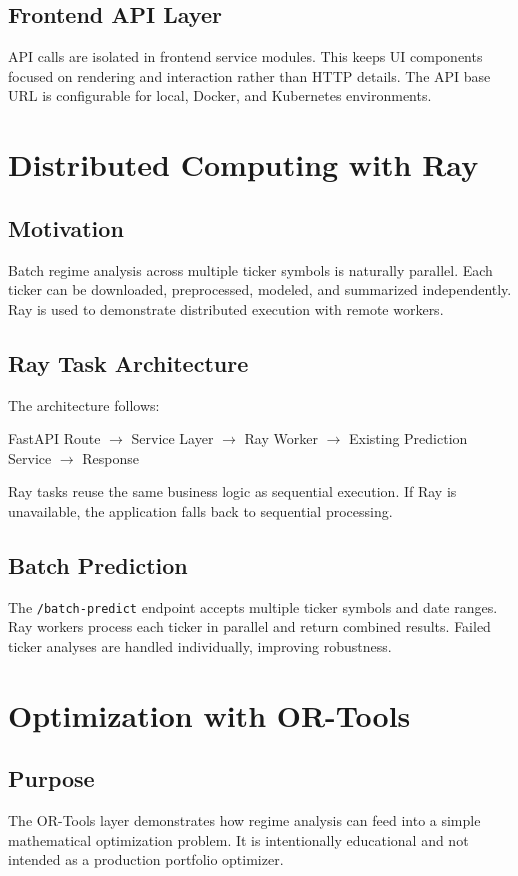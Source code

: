 \documentclass[12pt,a4paper]{report}
\begin{document}
\section{Frontend API Layer}
API calls are isolated in frontend service modules. This keeps UI components focused on rendering and interaction rather than HTTP details. The API base URL is configurable for local, Docker, and Kubernetes environments.

\chapter{Distributed Computing with Ray}
\section{Motivation}
Batch regime analysis across multiple ticker symbols is naturally parallel. Each ticker can be downloaded, preprocessed, modeled, and summarized independently. Ray is used to demonstrate distributed execution with remote workers.

\section{Ray Task Architecture}
The architecture follows:
\begin{center}
FastAPI Route $\rightarrow$ Service Layer $\rightarrow$ Ray Worker $\rightarrow$ Existing Prediction Service $\rightarrow$ Response
\end{center}
Ray tasks reuse the same business logic as sequential execution. If Ray is unavailable, the application falls back to sequential processing.

\section{Batch Prediction}
The \texttt{/batch-predict} endpoint accepts multiple ticker symbols and date ranges. Ray workers process each ticker in parallel and return combined results. Failed ticker analyses are handled individually, improving robustness.

\chapter{Optimization with OR-Tools}
\section{Purpose}
The OR-Tools layer demonstrates how regime analysis can feed into a simple mathematical optimization problem. It is intentionally educational and not intended as a production portfolio optimizer.
\end{document}
